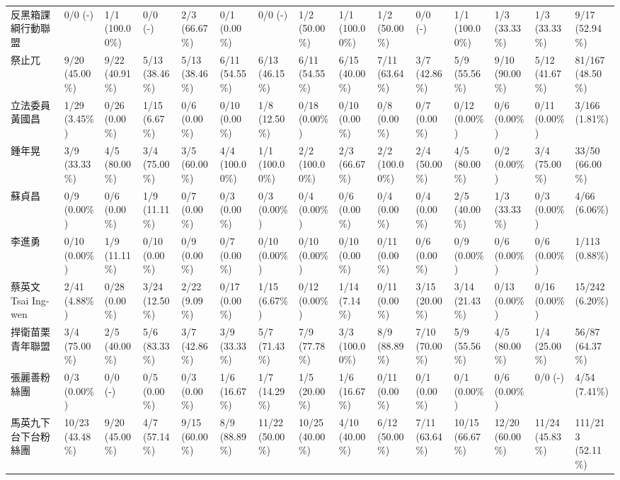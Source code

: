 \documentclass[a4paper, 10pt, conference]{ieeeconf}       %
\begin{document}
\begin{CJK}{UTF8}{bsmi}
\begin{landscape}
\begin{longtable}[c]{@{}L{2.45cm}L{1.1cm}L{1.1cm}L{1.1cm}L{1.1cm}L{1.1cm}L{1.1cm}L{1.1cm}L{1.1cm}L{1.1cm}L{1.1cm}L{1.1cm}L{1.1cm}L{1.1cm}L{1.1cm}@{}}
反黑箱課綱行動聯盟 & 0/0 (-) & 1/1 (100.00\%) & 0/0 (-) & 2/3 (66.67\%) & 0/1 (0.00\%) & 0/0 (-) & 1/2 (50.00\%) & 1/1 (100.00\%) & 1/2 (50.00\%) & 0/0 (-) & 1/1 (100.00\%) & 1/3 (33.33\%) & 1/3 (33.33\%) & 9/17 (52.94\%) \\
祭止兀 & 9/20 (45.00\%) & 9/22 (40.91\%) & 5/13 (38.46\%) & 5/13 (38.46\%) & 6/11 (54.55\%) & 6/13 (46.15\%) & 6/11 (54.55\%) & 6/15 (40.00\%) & 7/11 (63.64\%) & 3/7 (42.86\%) & 5/9 (55.56\%) & 9/10 (90.00\%) & 5/12 (41.67\%) & 81/167 (48.50\%) \\
立法委員 黃國昌 & 1/29 (3.45\%) & 0/26 (0.00\%) & 1/15 (6.67\%) & 0/6 (0.00\%) & 0/10 (0.00\%) & 1/8 (12.50\%) & 0/18 (0.00\%) & 0/10 (0.00\%) & 0/8 (0.00\%) & 0/7 (0.00\%) & 0/12 (0.00\%) & 0/6 (0.00\%) & 0/11 (0.00\%) & 3/166 (1.81\%) \\
鍾年晃 & 3/9 (33.33\%) & 4/5 (80.00\%) & 3/4 (75.00\%) & 3/5 (60.00\%) & 4/4 (100.00\%) & 1/1 (100.00\%) & 2/2 (100.00\%) & 2/3 (66.67\%) & 2/2 (100.00\%) & 2/4 (50.00\%) & 4/5 (80.00\%) & 0/2 (0.00\%) & 3/4 (75.00\%) & 33/50 (66.00\%) \\
蘇貞昌 & 0/9 (0.00\%) & 0/6 (0.00\%) & 1/9 (11.11\%) & 0/7 (0.00\%) & 0/3 (0.00\%) & 0/3 (0.00\%) & 0/4 (0.00\%) & 0/6 (0.00\%) & 0/4 (0.00\%) & 0/4 (0.00\%) & 2/5 (40.00\%) & 1/3 (33.33\%) & 0/3 (0.00\%) & 4/66 (6.06\%) \\
李進勇 & 0/10 (0.00\%) & 1/9 (11.11\%) & 0/10 (0.00\%) & 0/9 (0.00\%) & 0/7 (0.00\%) & 0/10 (0.00\%) & 0/10 (0.00\%) & 0/10 (0.00\%) & 0/11 (0.00\%) & 0/6 (0.00\%) & 0/9 (0.00\%) & 0/6 (0.00\%) & 0/6 (0.00\%) & 1/113 (0.88\%) \\
蔡英文 Tsai Ing-wen & 2/41 (4.88\%) & 0/28 (0.00\%) & 3/24 (12.50\%) & 2/22 (9.09\%) & 0/17 (0.00\%) & 1/15 (6.67\%) & 0/12 (0.00\%) & 1/14 (7.14\%) & 0/11 (0.00\%) & 3/15 (20.00\%) & 3/14 (21.43\%) & 0/13 (0.00\%) & 0/16 (0.00\%) & 15/242 (6.20\%) \\
捍衛苗栗青年聯盟 & 3/4 (75.00\%) & 2/5 (40.00\%) & 5/6 (83.33\%) & 3/7 (42.86\%) & 3/9 (33.33\%) & 5/7 (71.43\%) & 7/9 (77.78\%) & 3/3 (100.00\%) & 8/9 (88.89\%) & 7/10 (70.00\%) & 5/9 (55.56\%) & 4/5 (80.00\%) & 1/4 (25.00\%) & 56/87 (64.37\%) \\
張麗善粉絲團 & 0/3 (0.00\%) & 0/0 (-) & 0/5 (0.00\%) & 0/3 (0.00\%) & 1/6 (16.67\%) & 1/7 (14.29\%) & 1/5 (20.00\%) & 1/6 (16.67\%) & 0/11 (0.00\%) & 0/1 (0.00\%) & 0/1 (0.00\%) & 0/6 (0.00\%) & 0/0 (-) & 4/54 (7.41\%) \\
馬英九下台下台粉絲團 & 10/23 (43.48\%) & 9/20 (45.00\%) & 4/7 (57.14\%) & 9/15 (60.00\%) & 8/9 (88.89\%) & 11/22 (50.00\%) & 10/25 (40.00\%) & 4/10 (40.00\%) & 6/12 (50.00\%) & 7/11 (63.64\%) & 10/15 (66.67\%) & 12/20 (60.00\%) & 11/24 (45.83\%) & 111/213 (52.11\%) \\

\end{longtable}
\end{landscape}
\end{CJK}
\end{document}
